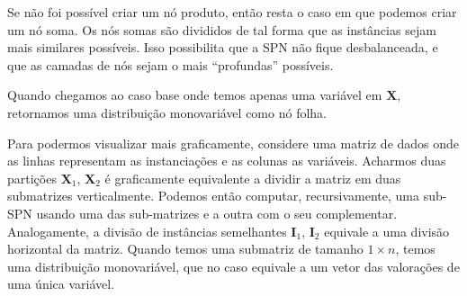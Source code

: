 \documentclass{amsart}
\theoremstyle{plain}
\numberwithin{equation}{section}
\newcommand{\set}[1]{\mathbf{#1}}
\begin{document}
Se não foi possível criar um nó produto, então resta o caso em que podemos criar um nó soma. Os nós
somas são divididos de tal forma que as instâncias sejam mais similares possíveis. Isso possibilita
que a SPN não fique desbalanceada, e que as camadas de nós sejam o mais ``profundas'' possíveis.

Quando chegamos ao caso base onde temos apenas uma variável em $\set{X}$, retornamos uma
distribuição monovariável como nó folha.

Para podermos visualizar mais graficamente, considere uma matriz de dados onde as linhas
representam as instanciações e as colunas as variáveis. Acharmos duas partições $\set{X}_1$,
$\set{X}_2$ é graficamente equivalente a dividir a matriz em duas submatrizes verticalmente.
Podemos então computar, recursivamente, uma sub-SPN usando uma das sub-matrizes e a outra com o seu
complementar. Analogamente, a divisão de instâncias semelhantes $\set{I}_1$, $\set{I}_2$ equivale
a uma divisão horizontal da matriz. Quando temos uma submatriz de tamanho $1\times n$, temos uma
distribuição monovariável, que no caso equivale a um vetor das valorações de uma única variável.


\newpage
\appendix

\newpage

\printbibliography[]
\end{document}
